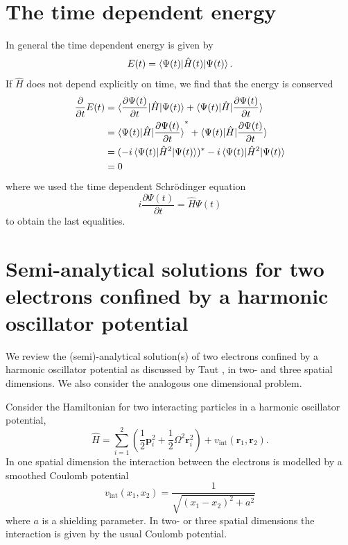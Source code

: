 \documentclass[aip,jcp,reprint,floatfix]{revtex4-1}
\begin{document}
\begin{appendices}
\section{The time dependent energy}
In general the time dependent energy is given by 
\begin{equation}
    E(t) = \braket{\Psi(t)|\hat{H}(t)|\Psi(t)}.
\end{equation}
If $\hat{H}$ does not depend explicitly on time, we find that the energy is conserved
\begin{align*}
     \frac{\partial}{\partial t}E(t) &= \braket{\frac{\partial \Psi(t)}{\partial t}|\hat{H}|\Psi(t)} + \braket{\Psi(t)|\hat{H}|\frac{\partial \Psi(t)}{\partial t}} \\
     &= \braket{\Psi(t)|\hat{H}|\frac{\partial \Psi(t)}{\partial t}}^* + \braket{\Psi(t)|\hat{H}|\frac{\partial \Psi(t)}{\partial t}} \\
     &= (-i\braket{\Psi(t)|\hat{H}^2|\Psi(t)})^* -i\braket{\Psi(t)|\hat{H}^2|\Psi(t)} \\
     &= 0
\end{align*}
where we used the time dependent Schrödinger equation 
\begin{equation}
    i \frac{\partial \Psi(t)}{\partial t}  = \hat{H} \Psi(t)
\end{equation}
to obtain the last equalities.
\section{Semi-analytical solutions for two electrons confined by a harmonic oscillator potential}
We review the (semi)-analytical solution(s) of two electrons confined by a harmonic oscillator potential as discussed by Taut \cite{Taut93,Taut94}, in two- and three spatial dimensions. We also consider the analogous one dimensional problem. 

Consider the Hamiltonian for two interacting particles in a harmonic oscillator potential, 
\begin{equation}
    \hat{H} = \sum_{i=1}^2 \left(\frac{1}{2} \mathbf{p}_i^2 + \frac{1}{2} \Omega^2 \mathbf{r}_i^2\right) + v_{\text{int}}(\mathbf{r}_1,\mathbf{r}_2). 
\end{equation}
In one spatial dimension the interaction between the electrons is modelled by a smoothed Coulomb potential \cite{SmoothedCoulomb} 
\begin{equation}
    v_{\text{int}}(x_1,x_2) = \frac{1}{\sqrt{(x_1-x_2)^2 + a^2}}
\end{equation}
where $a$ is a shielding parameter. In two- or three spatial dimensions the interaction is given by the usual Coulomb potential.


\end{appendices}
\end{document}
